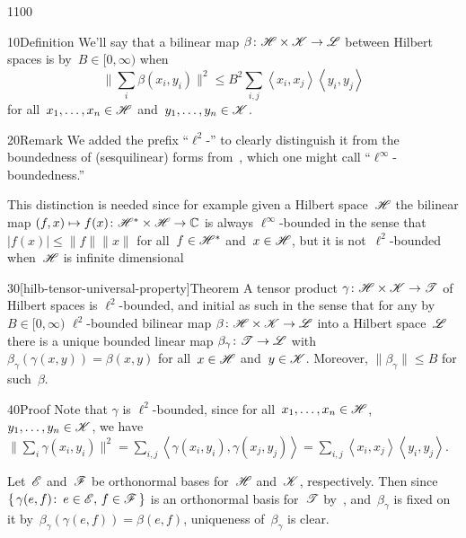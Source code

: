 \begin{parsec}{1100}%
\begin{point}{10}{Definition}%
We'll say that a bilinear map $\beta\colon\mathscr{H}\times\mathscr{K}\to\mathscr{L}$
between Hilbert spaces
is %
by~$B\in [0,\infty)$
when
\begin{equation*}
	\|\sum_{i}\beta(x_i,y_i)\|^2
\leq B^2 \sum_{i,j}\left<x_i,x_j\right>\left<y_i,y_j\right>
\end{equation*}
for all~$x_1,\dotsc,x_n\in \mathscr{H}$
and~$y_1,\dotsc,y_n\in\mathscr{K}$.
\begin{point}{20}{Remark}%
We added the prefix ``$\ell^2$-''
to clearly distinguish
it from the boundedness
of (sesquilinear) forms from~,
which one might call ``$\ell^\infty$-boundedness.''%

This distinction is needed
since for example given a Hilbert space~$\mathscr{H}$ the
bilinear map $(f,x)\mapsto f(x)\colon \mathscr{H}^*\times \mathscr{H}\to\mathbb{C}$
is always $\ell^\infty$-bounded in the 
sense that~$\left|f(x)\right|\leq \|f\|\|x\|$
for all~$f\in\mathscr{H}^*$ and~$x\in\mathscr{H}$,
but it is not~$\ell^2$-bounded
when~$\mathscr{H}$ is infinite dimensional
\end{point}
\end{point}
\begin{point}{30}[hilb-tensor-universal-property]{Theorem}%
A tensor product $\gamma\colon \mathscr{H}\times\mathscr{K}\to\mathscr{T}$
of Hilbert spaces
is $\ell^2$-bounded,
and initial as such 
in the sense
that for any by $B\in [0,\infty)$ 
$\ell^2$-bounded bilinear map $\beta\colon \mathscr{H}\times\mathscr{K} \to\mathscr{L}$
into a Hilbert space~$\mathscr{L}$
there is a unique bounded linear map $\beta_\gamma\colon\mathscr{T}
\to\mathscr{L}$
with $\beta_\gamma(\gamma(x,y))=\beta(x,y)$
for all~$x\in\mathscr{H}$ and~$y\in\mathscr{K}$.
Moreover, $\|\beta_\gamma\|\leq B$
for such~$\beta$.
\begin{point}{40}{Proof}%
Note that $\gamma$ is $\ell^2$-bounded,
since
for all~$x_1,\dotsc,x_n\in\mathscr{H}$,
$y_1,\dotsc,y_n\in\mathscr{K}$,
we have
$\|\sum_i\gamma(x_i,y_i)\|^2
= \sum_{i,j}\left<\gamma(x_i,y_i),
\gamma(x_j,y_j)\right>
= \sum_{i,j} \left<x_i,x_j\right>\left<y_i,y_j\right>$.

Let~$\mathscr{E}$ and~$\mathscr{F}$
be orthonormal bases
for~$\mathscr{H}$ and~$\mathscr{K}$, respectively.
Then since~$\{\,\gamma(e,f)\colon\,e\in\mathscr{E},\,f\in\mathscr{F}\,\}$
is an orthonormal basis for~$\mathscr{T}$
by~,
and~$\beta_\gamma$
is fixed on it by~$\beta_\gamma(\gamma(e,f))=\beta(e,f)$,
uniqueness of~$\beta_\gamma$ is clear.


\end{point}
\end{point}
\end{parsec}
